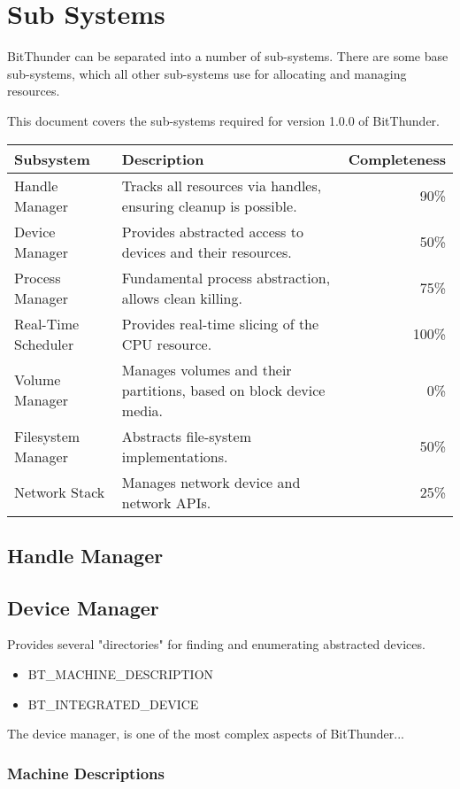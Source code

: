 \section{Sub Systems}
BitThunder can be separated into a number of sub-systems. There are some base sub-systems,
which all other sub-systems use for allocating and managing resources.

This document covers the sub-systems required for version 1.0.0 of BitThunder.

\begin{tabular}{|l|l|r|}
\hline 
Subsystem & Description & Completeness \\ 
\hline 
Handle Manager & Tracks all resources via handles, ensuring cleanup is possible. & 90\% \\ 
\hline 
Device Manager & Provides abstracted access to devices and their resources. & 50\% \\ 
\hline 
Process Manager & Fundamental process abstraction, allows clean killing. & 75\% \\ 
\hline
Real-Time Scheduler & Provides real-time slicing of the CPU resource. & 100\% \\ 
\hline 
Volume Manager & Manages volumes and their partitions, based on block device media. & 0\% \\ 
\hline
Filesystem Manager & Abstracts file-system implementations. & 50\% \\ 
\hline 
Network Stack & Manages network device and network APIs. & 25\% \\ 
\hline 
\end{tabular} 

\subsection{Handle Manager}


\subsection{Device Manager}
Provides several "directories" for finding and enumerating abstracted devices.
\begin{itemize}
\item BT_MACHINE_DESCRIPTION
\item BT_INTEGRATED_DEVICE
\end{itemize}

The device manager, is one of the most complex aspects of BitThunder...
\subsubsection{Machine Descriptions}
